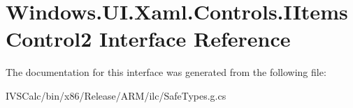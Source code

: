 \hypertarget{interface_windows_1_1_u_i_1_1_xaml_1_1_controls_1_1_i_items_control2}{}\section{Windows.\+U\+I.\+Xaml.\+Controls.\+I\+Items\+Control2 Interface Reference}
\label{interface_windows_1_1_u_i_1_1_xaml_1_1_controls_1_1_i_items_control2}


The documentation for this interface was generated from the following file\+:\begin{DoxyCompactItemize}
\item 
I\+V\+S\+Calc/bin/x86/\+Release/\+A\+R\+M/ilc/Safe\+Types.\+g.\+cs\end{DoxyCompactItemize}
